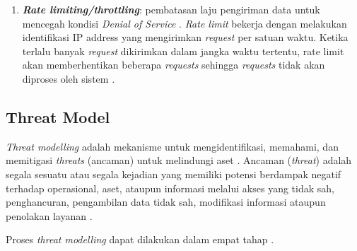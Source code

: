 \begin{enumerate}
    \item \textbf{\textit{Rate limiting/throttling}}: pembatasan laju pengiriman data untuk mencegah kondisi \textit{Denial of Service} \parencite{tripathi2025cia}.    
    \textit{Rate limit} bekerja dengan melakukan identifikasi IP address yang mengirimkan \textit{request} per satuan waktu.
    Ketika terlalu banyak \textit{request} dikirimkan dalam jangka waktu tertentu, rate limit akan memberhentikan beberapa \textit{requests} sehingga \textit{requests} tidak akan diproses oleh sistem \parencite{Cloudflare_Rate_Limit}.
\end{enumerate}

\subsection{Threat Model}\label{threat-model-studi}
\textit{Threat modelling} adalah mekanisme untuk mengidentifikasi, memahami, dan memitigasi \textit{threats} (ancaman) untuk melindungi aset \parencite{owaspThreatModeling}.
Ancaman (\textit{threat}) adalah segala sesuatu atau segala kejadian yang memiliki potensi berdampak negatif terhadap operasional, aset, ataupun informasi melalui akses yang tidak sah, penghancuran, pengambilan data tidak sah, modifikasi informasi ataupun penolakan layanan \parencite{Dodson2021_Threat}.

Proses \textit{threat modelling} dapat dilakukan dalam empat tahap \parencite{owaspThreatModelingProcess}.

